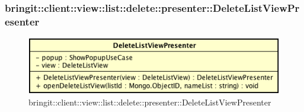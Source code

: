 \subsubsection{bringit::client::view::list::delete::presenter::DeleteListViewPresenter}

\label{bringit::client::view::list::delete::DeleteListViewPresenter}
\begin{figure}[H]
	\centering
	\includegraphics[scale=0.5]{Sezioni/SottosezioniST/img/app/DeleteListViewPresenter.png}
	\caption{bringit::client::view::list::delete::presenter::DeleteListViewPresenter}
\end{figure}

